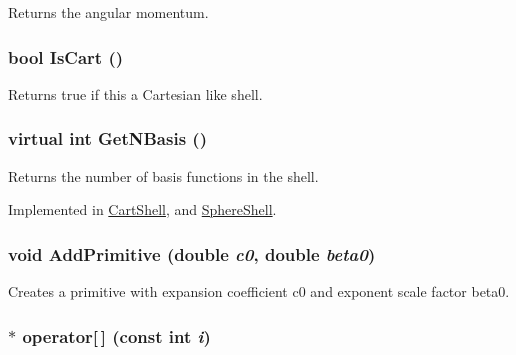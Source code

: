 Returns the angular momentum. \hypertarget{classJKBuilder_1_1Shell_a75c22d97e837f5c439eb51aa223bed98}{
\subsubsection[{IsCart}]{\setlength{\rightskip}{0pt plus 5cm}bool IsCart ()}}
\label{classJKBuilder_1_1Shell_a75c22d97e837f5c439eb51aa223bed98}


Returns true if this a Cartesian like shell. \hypertarget{classJKBuilder_1_1Shell_a1167cdb6f1e1ba08ba6cbffa0b32ca77}{
\subsubsection[{GetNBasis}]{\setlength{\rightskip}{0pt plus 5cm}virtual int GetNBasis ()}}
\label{classJKBuilder_1_1Shell_a1167cdb6f1e1ba08ba6cbffa0b32ca77}


Returns the number of basis functions in the shell. 

Implemented in \hyperlink{classJKBuilder_1_1CartShell_a297c144fb990284ac5973c99cdd55f91}{CartShell}, and \hyperlink{classJKBuilder_1_1SphereShell_a297c144fb990284ac5973c99cdd55f91}{SphereShell}.\hypertarget{classJKBuilder_1_1Shell_a20ec923cb07d5d3762fffa4501d09924}{
\subsubsection[{AddPrimitive}]{\setlength{\rightskip}{0pt plus 5cm}void AddPrimitive (double {\em c0}, \/  double {\em beta0})}}
\label{classJKBuilder_1_1Shell_a20ec923cb07d5d3762fffa4501d09924}


Creates a primitive with expansion coefficient c0 and exponent scale factor beta0. \hypertarget{classJKBuilder_1_1Shell_ae98a68bcb237e53c8c063aded1b34f2e}{
\subsubsection[{operator[]}]{ $\ast$ operator\mbox{[}$\,$\mbox{]} (const int {\em i})}}
\label{classJKBuilder_1_1Shell_ae98a68bcb237e53c8c063aded1b34f2e}



